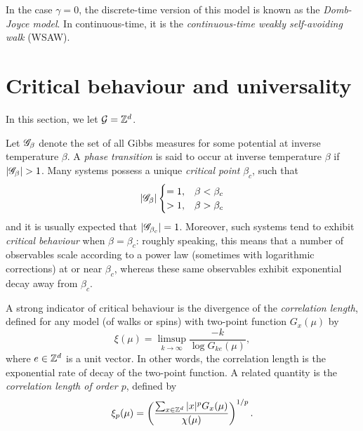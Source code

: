 In the case $\gamma = 0$, the discrete-time version of this model is known as
the \emph{Domb-Joyce model}. In continuous-time, it is the
\emph{continuous-time weakly self-avoiding walk} (WSAW).


\section{Critical behaviour and universality}


In this section, we let $\mathcal{G} = { {{\mathbb Z}}^d }$.

Let $\mathscr{G}_\beta$ denote the set of all Gibbs measures for some potential at inverse temperature $\beta$. A \emph{phase transition} is said to occur at inverse temperature $\beta$ if $|\mathscr{G}_\beta| > 1$. Many systems possess a unique \emph{critical point} $\beta_c$, such that
\begin{equation}
|\mathscr{G}_\beta|
\begin{cases}
=1,  & \beta < \beta_c \\
> 1, & \beta > \beta_c
\end{cases}
\end{equation}
and it is usually expected that $|\mathscr{G}_{\beta_c}| = 1$. Moreover, such systems tend to exhibit \emph{critical behaviour} when $\beta = \beta_c$:
roughly speaking, this means that a number of observables scale according to a power law (sometimes with logarithmic corrections) at or near $\beta_c$, whereas these same observables exhibit exponential decay away from $\beta_c$.

A strong indicator of critical behaviour is the divergence of the
\emph{correlation length}, defined for any model (of walks or spins) with two-point function $G_x(\mu)$ by
\begin{equation}
\xi(\mu) = \limsup_{k\to\infty} \frac{-k}{\log G_{ke}(\mu)},
\end{equation}
where $e \in { {{\mathbb Z}}^d }$ is a unit vector. In other words, the correlation length is the exponential rate of decay of the two-point function.
A related quantity is the \emph{correlation length of order $p$}, defined by
\begin{equation}
\xi_p(\mu) = \left(\frac{\sum_{x\in{ {{\mathbb Z}}^d }} |x|^p G_x(\mu)}{\chi(\mu)}\right)^{1/p}.
\end{equation}

